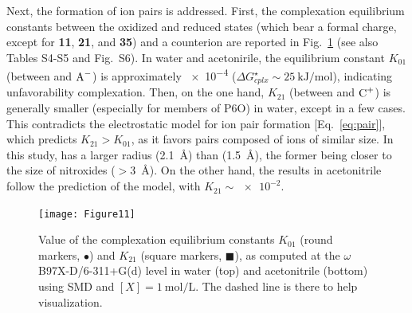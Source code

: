 \documentclass[review]{elsarticle}
\begin{document}
Next, the formation of ion pairs is addressed. First, the complexation equilibrium constants between the oxidized and reduced states (which bear a formal charge, except for \textbf{11}, \textbf{21}, and \textbf{35}) and a counterion are reported in Fig.~\ref{fig:Kx1} (see also Tables S4-S5 and Fig.~S6). In water and acetonirile, the equilibrium constant $K_{01}$ (between  and $\ce{A-}$) is approximately \num{e-4} ($\Delta G^\star_{cplx} \sim \SI{25}{\kilo\joule\per\mole}$), indicating unfavorability complexation. Then, on the one hand, $K_{21}$ (between  and $\ce{C+}$) is generally smaller (especially for members of P6O) in water, except in a few cases. This contradicts the electrostatic model for ion pair formation [Eq.~\eqref{eq:pair}], which predicts $K_{21} > K_{01}$, as it favors pairs composed of ions of similar size. In this study,  has a larger radius (\SI{2.1}{\angstrom}) than  (\SI{1.5}{\angstrom}), the former being closer to the size of nitroxides ($>$\SI{3}{\angstrom}). On the other hand, the results in acetonitrile follow the prediction of the model, with $K_{21} \sim \num{e-2}$.


\begin{figure}[!h]
\centering
\texttt{[image: Figure11]}
\caption{Value of the complexation equilibrium constants $K_{01}$ (round markers, $\bullet$) and $K_{21}$ (square markers, $\blacksquare$), as computed at the $\omega$B97X-D/6-311+G(d) level in water (top) and acetonitrile (bottom) using SMD and $[X]=\SI{1}{\mole\per\liter}$.  The dashed line is there to help visualization. }
\label{fig:Kx1}
\end{figure}
\end{document}
